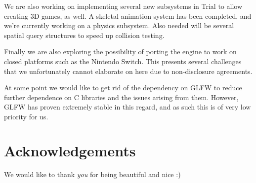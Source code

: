 \documentclass[format=sigconf]{acmart}
\begin{document}
We are also working on implementing several new subsystems in Trial to allow creating 3D games, as well. A skeletal animation system has been completed, and we're currently working on a physics subsystem. Also needed will be several spatial query structures to speed up collision testing.

Finally we are also exploring the possibility of porting the engine to work on closed platforms such as the Nintendo Switch. This presents several challenges that we unfortunately cannot elaborate on here due to non-disclosure agreements.

At some point we would like to get rid of the dependency on GLFW to reduce further dependence on C libraries and the issues arising from them. However, GLFW has proven extremely stable in this regard, and as such this is of very low priority for us.

\section{Acknowledgements}\label{acknowledgements}
We would like to thank \textit{you} for being beautiful and nice :)

\end{document}
